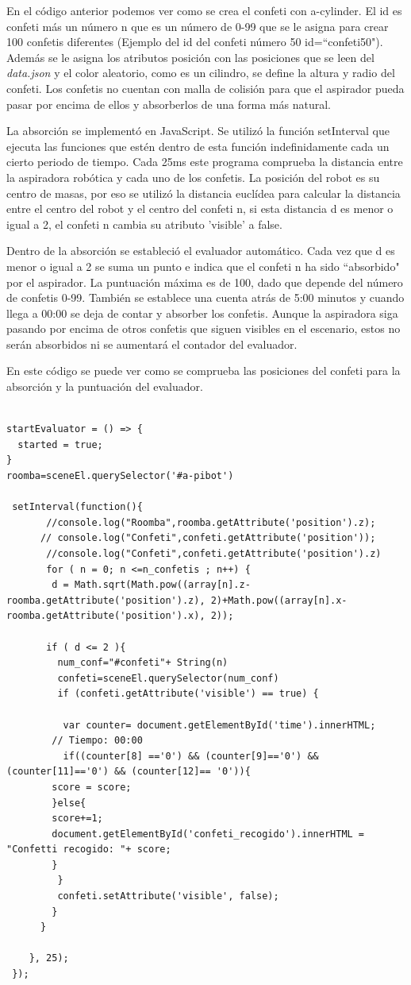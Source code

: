 En el código anterior podemos ver como se crea el confeti  con  a-cylinder. El id es confeti más un número  n que es un número de 0-99 que se le asigna para crear 100 confetis diferentes (Ejemplo del id del confeti número 50   id=``confeti50"). Además se le asigna los atributos posición con las posiciones que se leen del \textit{data.json} y el color aleatorio, como es un cilindro, se define la altura y radio del confeti.
Los confetis no cuentan con malla de colisión para que el aspirador pueda pasar por encima de ellos y absorberlos de una forma más natural.

La absorción se implementó en JavaScript. Se utilizó la función setInterval que ejecuta las funciones que estén dentro de esta función indefinidamente cada un cierto periodo de tiempo.
Cada 25ms este programa comprueba la distancia entre la aspiradora robótica y cada uno de los confetis. La posición del robot es su centro de masas, por eso se  utilizó la distancia euclídea para calcular la distancia entre el centro del robot y el centro del confeti n, si esta distancia d es menor o igual a 2, el confeti n cambia su atributo 'visible' a false. 

Dentro de la absorción se estableció el evaluador automático. Cada vez que d es menor o igual a 2 se suma un punto e indica que el confeti n ha sido  ``absorbido" por el aspirador. La puntuación máxima es de 100, dado que depende del número de confetis 0-99. También se establece una cuenta atrás de 5:00 minutos y cuando llega a 00:00 se deja de contar y absorber los confetis. Aunque la aspiradora siga pasando por encima de otros confetis que siguen visibles en el escenario, estos no serán absorbidos ni se aumentará el contador del evaluador.

En este código se puede ver como se comprueba las posiciones del confeti para la absorción y la puntuación del evaluador.
\begin{lstlisting}

startEvaluator = () => {
  started = true;
}
roomba=sceneEl.querySelector('#a-pibot')

 setInterval(function(){
       //console.log("Roomba",roomba.getAttribute('position').z);
      // console.log("Confeti",confeti.getAttribute('position'));
       //console.log("Confeti",confeti.getAttribute('position').z)
       for ( n = 0; n <=n_confetis ; n++) {
        d = Math.sqrt(Math.pow((array[n].z-roomba.getAttribute('position').z), 2)+Math.pow((array[n].x-roomba.getAttribute('position').x), 2));

       if ( d <= 2 ){
         num_conf="#confeti"+ String(n)
         confeti=sceneEl.querySelector(num_conf)
         if (confeti.getAttribute('visible') == true) {
	      
	      var counter= document.getElementById('time').innerHTML;
		// Tiempo: 00:00	
	      if((counter[8] =='0') && (counter[9]=='0') && (counter[11]=='0') && (counter[12]== '0')){      
		score = score;
		}else{
		score+=1;
		document.getElementById('confeti_recogido').innerHTML = "Confetti recogido: "+ score;
		}
         }
         confeti.setAttribute('visible', false);
        }
      }
	
    }, 25);
 });
\end{lstlisting}

